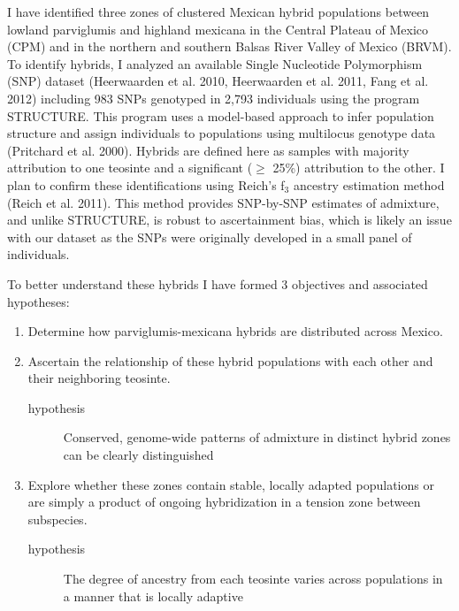 \documentclass[12pt]{amsart}
\begin{document}
I have identified three zones of clustered Mexican hybrid populations between lowland parviglumis and highland mexicana in the Central Plateau of Mexico (CPM) and in the northern and southern Balsas River Valley of Mexico (BRVM). 
To identify hybrids, I analyzed an available Single Nucleotide Polymorphism (SNP) dataset  (Heerwaarden et al. 2010, Heerwaarden et al. 2011, Fang et al. 2012) including 983 SNPs genotyped in 2,793 individuals using the program STRUCTURE.
This program uses a model-based approach to infer population structure and assign individuals to populations using multilocus genotype data (Pritchard et al. 2000).
Hybrids are defined here as samples with majority attribution to one teosinte and a significant ($\geq$ 25\%) attribution to the other.
I plan to confirm these identifications using Reich's f$_{\text{3}}$ ancestry estimation method (Reich et al. 2011).  
This method provides SNP-by-SNP estimates of admixture, and unlike STRUCTURE, is robust to ascertainment bias, which is likely an issue with our dataset as the SNPs were originally developed in a small panel of individuals.

To better understand these hybrids I have formed 3 objectives and associated hypotheses: 
\begin{enumerate} 
	\item Determine how parviglumis-mexicana hybrids are distributed across Mexico.
	\item Ascertain the relationship of these hybrid populations with each other and their neighboring teosinte.
		\begin{description} \item[hypothesis] Conserved, genome-wide patterns of admixture in distinct hybrid zones can be clearly distinguished \end{description}
	\item Explore whether these zones contain stable, locally adapted populations or are simply a product of ongoing hybridization in a tension zone between subspecies.
		\begin{description} \item[hypothesis] The degree of ancestry from each teosinte varies across populations in a manner that is locally adaptive \end{description}
\end{enumerate} 
\end{document}
